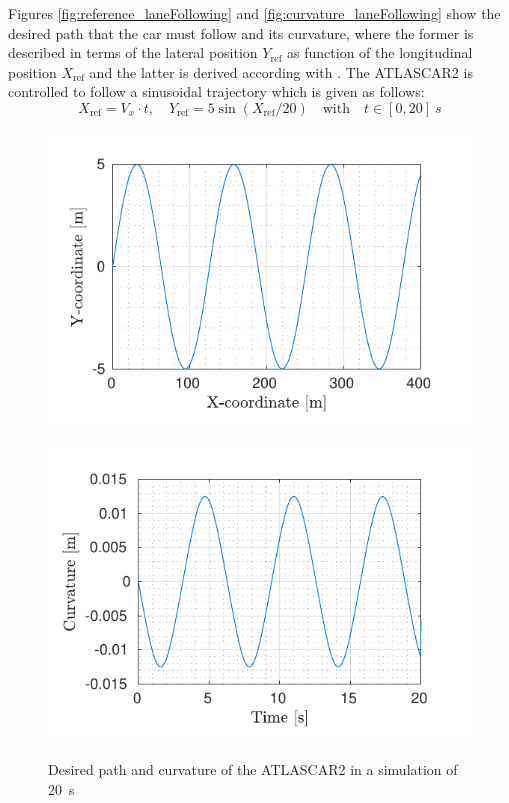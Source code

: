 Figures \ref{fig:reference_laneFollowing} and \ref{fig:curvature_laneFollowing} show the desired path that the car must follow and its curvature, where the former is described in terms of the lateral position $Y_{\text{ref}}$ as function of the longitudinal position $X_{\text{ref}}$ and the latter is derived according with \cite{curvature}. The ATLASCAR2 is controlled to follow a sinusoidal trajectory which is given as follows:
\begin{equation*}
X_\text{ref}=V_x\cdot t, \quad Y_\text{ref}=5\sin(X_\text{ref}/20)\quad \text{with}\quad t\in[0,20]\SI{}{s}
\end{equation*}
\begin{figure}[!t]
	\centering
	\begin{minipage}[t]{0.49\textwidth}
		\includegraphics[width=\textwidth]{../../MATLAB/lane_following/figure/Reference.pdf}
		\subcaption{}
		\label{fig:reference_laneFollowing}
	\end{minipage}
	\begin{minipage}[t]{0.5\textwidth}
		\includegraphics[width=\textwidth]{../../MATLAB/lane_following/figure/Curvature.pdf}
		\subcaption{}
		\label{fig:curvature_laneFollowing}
	\end{minipage}
	\caption{Desired path and curvature of the ATLASCAR2 in a simulation of \SI{20}{s}}
	\label{fig:laneFollowing_desired}
\end{figure}

